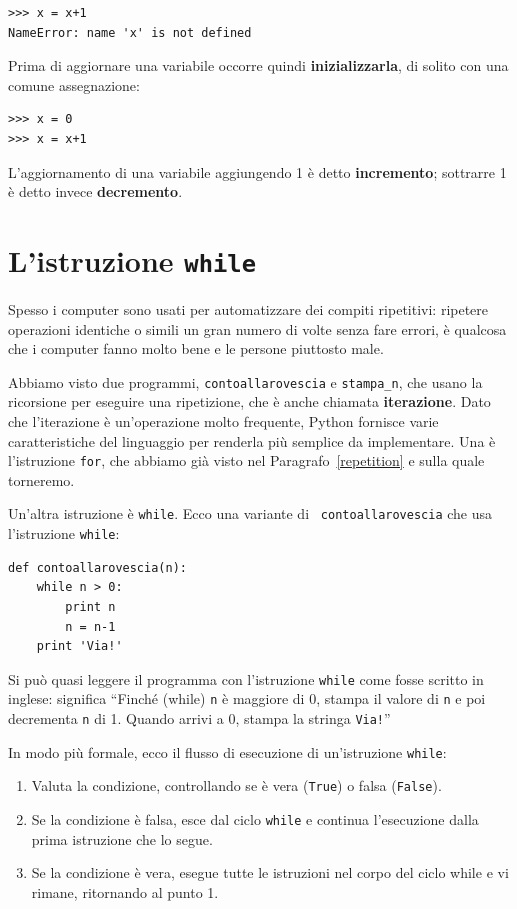 \documentclass[10pt]{book}
\begin{document}
\begin{verbatim}
>>> x = x+1
NameError: name 'x' is not defined
\end{verbatim}
%
Prima di aggiornare una variabile occorre quindi {\bf inizializzarla},
di solito con una comune assegnazione:

\begin{verbatim}
>>> x = 0
>>> x = x+1
\end{verbatim}
%
L'aggiornamento di una variabile aggiungendo 1 è detto {\bf incremento};
sottrarre 1 è detto invece {\bf decremento}.




\section{L'istruzione {\tt while}}

Spesso i computer sono usati per automatizzare dei compiti ripetitivi: ripetere operazioni identiche o simili un gran numero di volte senza fare errori, è qualcosa che i computer fanno molto bene e le persone piuttosto male.

Abbiamo visto due programmi, {\tt contoallarovescia} e \verb"stampa_n", che   usano la ricorsione per eseguire una ripetizione, che è anche chiamata {\bf
iterazione}. Dato che l'iterazione è un'operazione molto frequente, Python fornisce varie caratteristiche del linguaggio per renderla più semplice da implementare. Una è l'istruzione {\tt for}, che abbiamo già visto nel Paragrafo~\ref{repetition} e sulla quale torneremo.

Un'altra istruzione è {\tt while}. Ecco una variante di {\tt
contoallarovescia} che usa l'istruzione {\tt while}:

\begin{verbatim}
def contoallarovescia(n):
    while n > 0:
        print n
        n = n-1
    print 'Via!'
\end{verbatim}
%
Si può quasi leggere il programma con l'istruzione {\tt while} come fosse scritto in inglese: significa ``Finché (while) {\tt n} è maggiore di 0, stampa il valore di {\tt n} e poi decrementa {\tt n} di 1.  Quando arrivi a 0, stampa la stringa {\tt Via!}''

In modo più formale, ecco il flusso di esecuzione di un'istruzione {\tt while}:

\begin{enumerate}

\item Valuta la condizione, controllando se è vera ({\tt True}) o falsa ({\tt False}).

\item Se la condizione è falsa, esce dal ciclo {\tt while} e continua       l'esecuzione dalla prima istruzione che lo segue.

\item Se la condizione è vera, esegue tutte le istruzioni nel corpo del ciclo while e vi rimane, ritornando al punto 1.

\end{enumerate}
\end{document}
